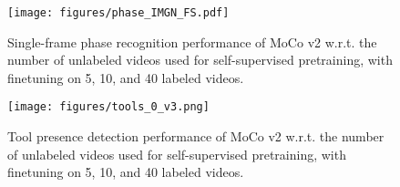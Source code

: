 \documentclass[times,twocolumn,final]{elsarticle}
\begin{document}
\begin{figure}[ht!]
    \texttt{[image: figures/phase\_IMGN\_FS.pdf]}
    \caption{Single-frame phase recognition performance of MoCo v2 w.r.t. the number of unlabeled videos used for self-supervised pretraining, with finetuning on 5, 10, and 40 labeled videos.}
    \label{fig:data_supply_phase}
\end{figure}

\begin{figure}[ht!]
    \texttt{[image: figures/tools\_0\_v3.png]}
    \caption{Tool presence detection performance of MoCo v2 w.r.t. the number of unlabeled videos used for self-supervised pretraining, with finetuning on 5, 10, and 40 labeled videos.}
    \label{fig:data_supply_tools}
\end{figure}
\end{document}
